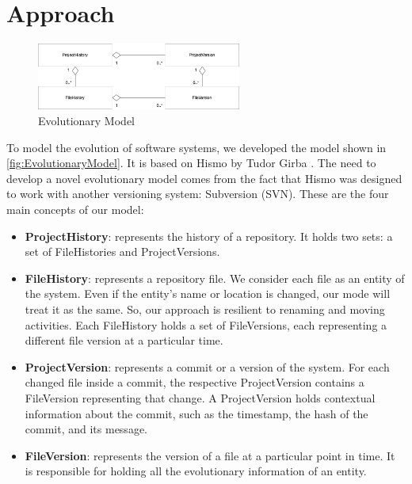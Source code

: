 \documentclass[11pt,twoside,english,singlespacing,headsepline,consistentlayout]{auxiliary/si-msc-thesis}
\begin{document}
\section*{Approach}
\begin{figure}[ht]
    \begin{center}
        \includegraphics[width=0.6\textwidth]{images/approach/EvolutionModel.jpg}
    \end{center}
    \caption{Evolutionary Model}
    \label{fig:EvolutionaryModel}
\end{figure}


To model the evolution of software systems, we developed the model 
shown in \autoref{fig:EvolutionaryModel}. It is based on Hismo by Tudor Girba \cite{Girba2005}.
The need to develop a novel evolutionary model comes from the fact that Hismo was designed to work with another versioning system: Subversion (SVN). 
These are the four main concepts of our model: 
\begin{itemize}
    \item \textbf{ProjectHistory}: represents the history of a repository. It holds two sets: a set of FileHistories and ProjectVersions. 
    \item \textbf{FileHistory}: represents a repository file. We consider each file as an entity of the system. Even if the entity's name or location is changed, our mode will treat it as the same. So, our approach is resilient to renaming and moving activities. Each FileHistory holds a set of FileVersions, each representing a different file version at a particular time.  
    \item \textbf{ProjectVersion}: represents a commit or a version of the system. 
    For each changed file inside a commit, the respective ProjectVersion contains a FileVersion representing that change.
    A ProjectVersion holds contextual information about the commit, such as the timestamp, the hash of the commit, and its message.
    \item \textbf{FileVersion}: represents the version of a file at a particular point in time.
    It is responsible for holding all the evolutionary information of an entity. 
\end{itemize}
\end{document}
